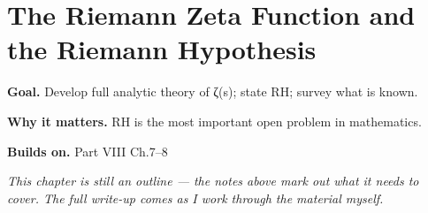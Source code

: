 \chapter{The Riemann Zeta Function and the Riemann Hypothesis}
\label{ch:08-complex-analysis-and-harmonic-analysis-09}

\begin{chapterintro}
\textbf{Goal.} Develop full analytic theory of ζ(s); state RH; survey what is known.

\textbf{Why it matters.} RH is the most important open problem in mathematics.

\textbf{Builds on.} Part VIII Ch.7–8
\end{chapterintro}

\textit{This chapter is still an outline --- the notes above mark out what it needs to cover. The full write-up comes as I work through the material myself.}
